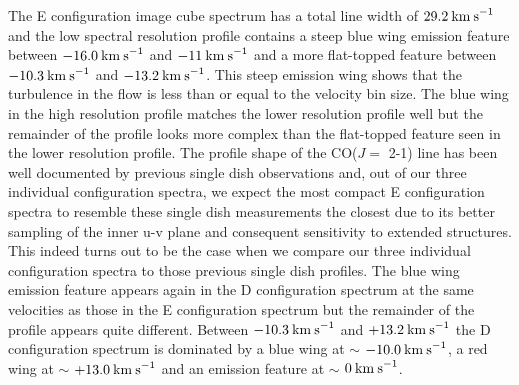 \documentclass[iop]{emulateapj}
\begin{document}
The E configuration image cube spectrum has a total line width of $29.2\>{\rm km\>s}^{-1}$ and the low spectral resolution profile contains a steep blue wing emission feature between $-16.0\>{\rm km\>s}^{-1}$ and $-11\>{\rm km\>s}^{-1}$ and a more flat-topped feature between $-10.3\>{\rm km\>s}^{-1}$ and $-13.2\>{\rm km\>s}^{-1}$. This steep emission wing shows that the turbulence in the flow is less than or equal to the velocity bin size. The blue wing in the high resolution profile matches the lower resolution profile well but the  remainder of the profile looks more complex than the flat-topped feature seen in the lower resolution profile. The profile shape of the CO($J=$ 2-1) line has been well documented by previous single dish observations \citep[e.g.][]{1980ApJ...242L..25K, 1987ApJ...313..400H} and, out of our three individual configuration spectra, we expect the most compact E configuration spectra to resemble these single dish measurements the closest due to its better sampling of the inner u-v plane and consequent sensitivity to extended structures. This indeed turns out to be the case when we compare our three individual configuration spectra to those previous single dish profiles. The blue wing emission feature appears again in the D configuration spectrum at the same velocities as those in the E configuration spectrum but the remainder of the profile appears quite different. Between $-10.3\>{\rm km\>s}^{-1}$ and $+13.2\>{\rm km\>s}^{-1}$ the D configuration spectrum is dominated by a blue wing at $\sim$ $-10.0\>{\rm km\>s}^{-1}$, a red wing at $\sim$ $+13.0\>{\rm km\>s}^{-1}$ and an emission feature at $\sim$ $0\>{\rm km\>s}^{-1}$. 
\end{document}

